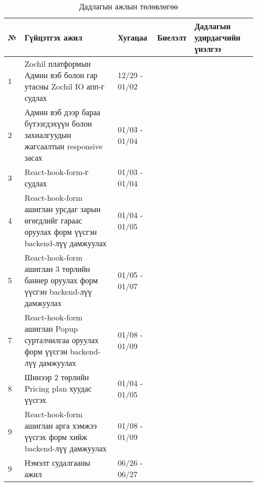\begin{table}[h]
	\caption{Дадлагын ажлын төлөвлөгөө}
	\begin{tabular}{|p{0.5cm}|p{8cm}|l|l|p{3cm}|}
	\hline
	\textbf{№} & \textbf{Гүйцэтгэх ажил} & \textbf{Хугацаа} & \textbf{Биелэлт} & \textbf{Дадлагын удирдагчийн үнэлгээ} \\ \hline
	1 & Zochil платформын Админ вэб болон гар утасны Zochil IO апп-г судлах & 12/29 - 01/02 && \\ \hline
	2 & Админ вэб дээр бараа бүтээгдэхүүн болон захиалгуудын жагсаалтын responsive засах & 01/03 - 01/04 && \\ \hline
	3 & React-hook-form-г судлах & 01/03 - 01/04 && \\ \hline
	4 & React-hook-form ашиглан урсдаг зарын өгөгдлийг гараас оруулах форм үүсгэн backend-лүү дамжуулах  & 01/04 - 01/05 && \\ \hline
	5 & React-hook-form ашиглан 3 төрлийн баннер оруулах форм үүсгэн backend-лүү дамжуулах  & 01/05 - 01/07 && \\ \hline
	7 & React-hook-form ашиглан Popup сурталчилгаа оруулах форм үүсгэн backend-лүү дамжуулах  & 01/08 - 01/09 && \\ \hline
	8 & Шинээр 2 төрлийн Pricing plan хуудас үүсгэх  & 01/04 - 01/05 && \\ \hline
   9 & React-hook-form ашиглан арга хэмжээ үүсгэх форм хийж backend-лүү дамжуулах  & 01/08 - 01/09 && \\ \hline
	9 & Нэмэлт судалгааны ажил & 06/26 - 06/27 && \\ \hline

	\end{tabular}
\end{table}